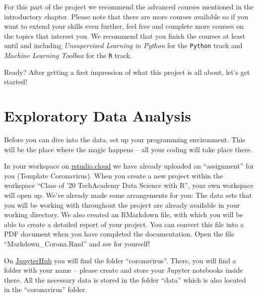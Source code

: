 \documentclass[
  11pt,
]{article}
\newenvironment{tips}[1]
  {
  \begin{itemize}
  \footnotesize
  \renewcommand{\labelitemi}{
    \raisebox{-.7\height}[0pt][0pt]{
      {\setkeys{Gin}{width=3em,keepaspectratio}
        \texttt{[image: images/\#1.png]}}
    }
  }
  \setlength{\fboxsep}{1em}
  \begin{rbox}
  \item
  }
  {
  \end{rbox}
  \end{itemize}
  }
\newenvironment{tipsp}[1]
  {
  \begin{itemize}
  \footnotesize
  \renewcommand{\labelitemi}{
    \raisebox{-.7\height}[0pt][0pt]{
      {\setkeys{Gin}{width=3em,keepaspectratio}
        \texttt{[image: images/\#1.png]}}
    }
  }
  \setlength{\fboxsep}{1em}
  \begin{pbox}
  \item
  }
  {
  \end{pbox}
  \end{itemize}
  }
\begin{document}
For this part of the project we recommend the advanced courses mentioned in the introductory chapter. Please note that there are more courses available so if you want to extend your skills even further, feel free and complete more courses on the topics that interest you. We recommend that you finish the courses at least until and including \emph{Unsupervised Learning in Python} for the \texttt{Python} track and \emph{Machine Learning Toolbox} for the \texttt{R} track.

Ready? After getting a first impression of what this project is all about, let's get started!

\newpage

\hypertarget{exploratory-data-analysis}{%
\section{Exploratory Data Analysis}\label{exploratory-data-analysis}}

Before you can dive into the data, set up your programming environment. This will be the place where the magic happens -- all your coding will take place there.

\begin{tips}r

In your workspace on \href{https://rstudio.cloud/projects}{rstudio.cloud} we have already uploaded an ``assignment'' for you (Template Coronavirus). When you create a new project within the workspace ``Class of '20 \textbar{} TechAcademy \textbar{} Data Science with R'', your own workspace will open up. We've already made some arrangements for you: The data sets that you will be working with throughout the project are already available in your working directory. We also created an RMarkdown file, with which you will be able to create a detailed report of your project. You can convert this file into a PDF document when you have completed the documentation. Open the file ``Markdown\_Corona.Rmd'' and see for yourself!

\end{tips}

\begin{tipsp}p

On \href{http://tech-academy.io/jupyter}{JupyterHub} you will find the folder ``coronavirus''. There, you will find a folder with your name -- please create and store your Jupyter notebooks inside there.
All the necessary data is stored in the folder ``data'' which is also located in the ``coronavirus'' folder.

\end{tipsp}
\end{document}
